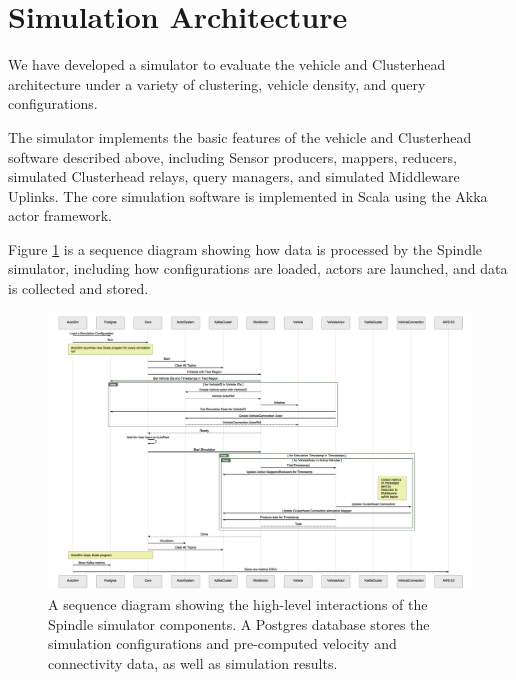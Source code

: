 \documentclass{thesis}
\begin{document}

\section{Simulation Architecture}
    We have developed a simulator to evaluate the vehicle and Clusterhead architecture under a variety of clustering,
    vehicle density, and query configurations.

    The simulator implements the basic features of the vehicle and Clusterhead software described above, including
    Sensor producers, mappers, reducers, simulated Clusterhead relays, query managers, and simulated Middleware Uplinks.
    The core simulation software is implemented in Scala using the Akka actor framework.

    Figure \ref{sim:sequence} is a sequence diagram showing how data is processed by the Spindle simulator, including
    how configurations are loaded, actors are launched, and data is collected and stored.

    \begin{figure}
        \centering
        \includegraphics[width=\textheight]{binImages/simulator-sequence.png}
        \caption{A sequence diagram showing the high-level interactions of
        the Spindle simulator components. A Postgres database stores the
        simulation configurations and pre-computed velocity and connectivity
        data, as well as simulation results.}
        \label{sim:sequence}
    \end{figure}
\end{document}
